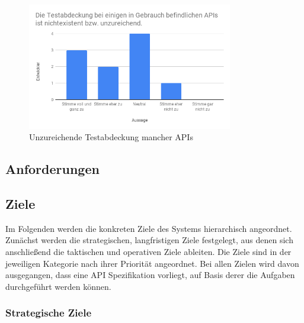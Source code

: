 \begin{figure}[H]
\centering
  \includegraphics[width=0.8\textwidth]{../images/insufficient_coverage.png}
  \caption{Unzureichende Testabdeckung mancher APIs}
  \label{fig:sv-insufficient-coverage}
\end{figure}


\subsection{Anforderungen}

\subsection{Ziele}

Im Folgenden werden die konkreten Ziele des Systems hierarchisch angeordnet. Zunächst werden die strategischen, langfristigen Ziele festgelegt, aus denen sich anschließend die taktischen und operativen Ziele ableiten. Die Ziele sind in der jeweiligen Kategorie nach ihrer Priorität angeordnet. Bei allen Zielen wird davon ausgegangen, dass eine API Spezifikation vorliegt, auf Basis derer die Aufgaben durchgeführt werden können.


\subsubsection{Strategische Ziele}

